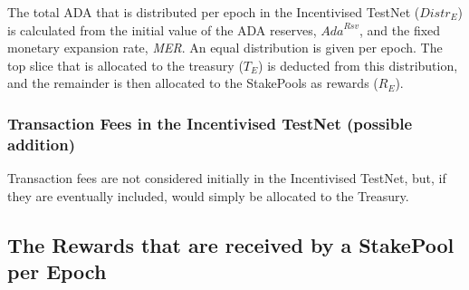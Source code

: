 \documentclass[11pt,a4paper,dvipsnames,twosided,final]{article}
\newcommand{\ada}{ADA{}}
\begin{document}
\noindent
The total \ada{} that is distributed per epoch in the Incentivised TestNet (${\textit{Distr}}_E$) is calculated from the initial
value of the \ada{} reserves, $\textit{Ada}^{\textit{Rsv}}$, and the fixed monetary expansion rate, \textit{MER}.
An equal distribution is given per epoch.  The top slice that is allocated to the treasury ($T_E$) is
deducted from this distribution, and the remainder is then allocated to the StakePools as rewards ($R_E$).

\subsubsection*{Transaction Fees in the Incentivised TestNet (possible addition)}

Transaction fees are not considered initially in the Incentivised TestNet, but, if they are eventually included, would simply be allocated to
the Treasury.


\subsection{The Rewards that are received by a StakePool per Epoch}
\end{document}

